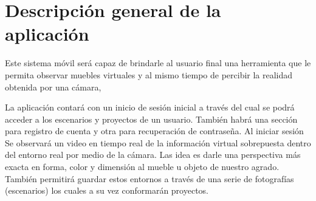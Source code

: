 \section{Descripción general de la aplicación}
Este sistema móvil será capaz de  brindarle al usuario final una herramienta que le permita observar muebles virtuales y al mismo tiempo de percibir la realidad obtenida por una cámara,\par

La aplicación contará con un inicio de sesión inicial a través del cual se podrá acceder a los escenarios y proyectos de un usuario. También habrá una sección para registro de cuenta y otra para recuperación de contraseña.
Al iniciar sesión
Se observará un video en tiempo real de la información virtual sobrepuesta dentro del entorno real por medio de la cámara. Las idea es darle una perspectiva más exacta en forma, color y dimensión al mueble u objeto de nuestro agrado. También permitirá guardar estos entornos a través de una serie de fotografías (escenarios) los cuales a su vez conformarán proyectos. %
